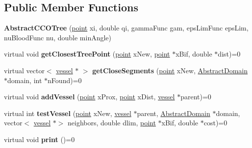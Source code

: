 \subsection*{Public Member Functions}
\begin{DoxyCompactItemize}
\item 
\mbox{\label{class_abstract_c_c_o_tree_a613463081c4c7c7d58223923b05341dc}} 
{\bfseries Abstract\+C\+C\+O\+Tree} (\mbox{\hyperlink{structpoint}{point}} xi, double qi, gamma\+Func gam, eps\+Lim\+Func eps\+Lim, nu\+Blood\+Func nu, double min\+Angle)
\item 
\mbox{\label{class_abstract_c_c_o_tree_acf6d6fe7be04c166c7eb6403e07b2d78}} 
virtual void {\bfseries get\+Closest\+Tree\+Point} (\mbox{\hyperlink{structpoint}{point}} x\+New, \mbox{\hyperlink{structpoint}{point}} $\ast$x\+Bif, double $\ast$dist)=0
\item 
\mbox{\label{class_abstract_c_c_o_tree_ab1107c525ea8fbe6d8603642cbee8b72}} 
virtual vector$<$ \mbox{\hyperlink{structvessel}{vessel}} $\ast$ $>$ {\bfseries get\+Close\+Segments} (\mbox{\hyperlink{structpoint}{point}} x\+New, \mbox{\hyperlink{class_abstract_domain}{Abstract\+Domain}} $\ast$domain, int $\ast$n\+Found)=0
\item 
\mbox{\label{class_abstract_c_c_o_tree_aa19c55699734d971036a4ab76ce708e8}} 
virtual void {\bfseries add\+Vessel} (\mbox{\hyperlink{structpoint}{point}} x\+Prox, \mbox{\hyperlink{structpoint}{point}} x\+Dist, \mbox{\hyperlink{structvessel}{vessel}} $\ast$parent)=0
\item 
\mbox{\label{class_abstract_c_c_o_tree_a3d13d93af07901a8186cecbc3b618f18}} 
virtual int {\bfseries test\+Vessel} (\mbox{\hyperlink{structpoint}{point}} x\+New, \mbox{\hyperlink{structvessel}{vessel}} $\ast$parent, \mbox{\hyperlink{class_abstract_domain}{Abstract\+Domain}} $\ast$domain, vector$<$ \mbox{\hyperlink{structvessel}{vessel}} $\ast$$>$ neighbors, double dlim, \mbox{\hyperlink{structpoint}{point}} $\ast$x\+Bif, double $\ast$cost)=0
\item 
\mbox{\label{class_abstract_c_c_o_tree_ac97ae2a27d8d386b9dfb862dbad5bb2f}} 
virtual void {\bfseries print} ()=0
$$
\end{DoxyCompactItemize}
